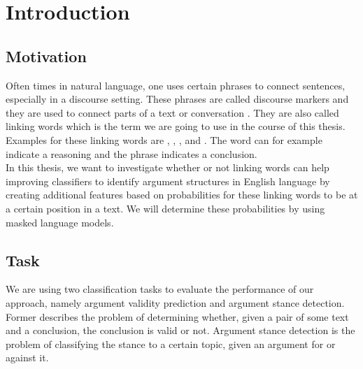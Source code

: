\section{Introduction}
\subsection{Motivation}
Often times in natural language, one uses certain phrases to connect sentences, especially in a discourse setting. These phrases are called discourse markers and they are used to connect parts of a text or conversation \cite{Discours1999}. They are also called linking words which is the term we are going to use in the course of this thesis. Examples for these linking words are , , ,  and . The word  can for example indicate a reasoning and the phrase  indicates a conclusion. \\
In this thesis, we want to investigate whether or not linking words can help improving classifiers to identify argument structures in English language by creating additional features based on probabilities for these linking words to be at a certain position in a text. We will determine these probabilities by using masked language models.
\subsection{Task}
We are using two classification tasks to evaluate the performance of our approach, namely argument validity prediction and argument stance detection. Former describes the problem of determining whether, given a pair of some text and a conclusion, the conclusion is valid or not. Argument stance detection is the problem of classifying the stance to a certain topic, given an argument for or against it. \\
